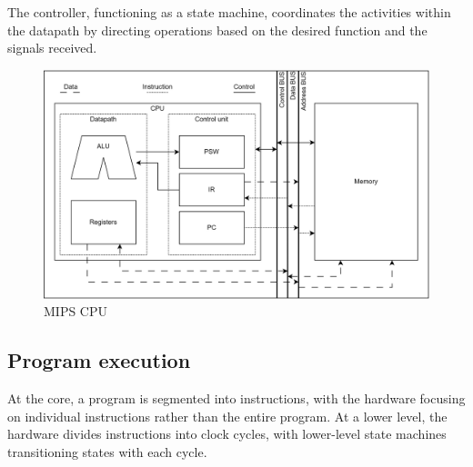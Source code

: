 The controller, functioning as a state machine, coordinates the activities within the datapath by directing operations based on the desired function and the signals received.
\begin{figure}[H]
    \centering
    \includegraphics[width=0.75\linewidth]{images/cpu.png}
    \caption{MIPS CPU}
\end{figure}

\subsection{Program execution}
At the core, a program is segmented into instructions, with the hardware focusing on individual instructions rather than the entire program. 
At a lower level, the hardware divides instructions into clock cycles, with lower-level state machines transitioning states with each cycle.